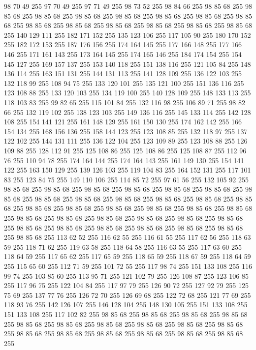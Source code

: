 98 70 49 255 97 70 49 255 97 71 49 255 98 73 52 255 98 84 66 255 98 85 68 255 98 85 68 255 98 85 68 255 98 85 68 255 98 85 68 255 98 85 68 255 98 85 68 255 98 85 68 255 98 85 68 255 98 85 68 255 98 85 68 255 98 85 68 255 98 85 68 255 98 85 68 255 140 129 111 255 182 171 152 255 135 123 106 255 117 105 90 255 180 170 152 255 182 172 153 255 187 176 156 255 174 164 145 255 177 166 148 255 177 166 146 255 171 161 143 255 173 164 145 255 174 165 146 255 184 174 154 255 154 145 127 255 169 157 137 255 153 140 118 255 151 138 116 255 121 105 84 255 148 136 114 255 163 151 131 255 144 131 113 255 141 128 109 255 136 122 103 255 132 118 99 255 108 94 75 255 133 120 101 255 135 121 100 255 151 136 116 255 123 108 88 255 133 120 103 255 134 119 100 255 140 128 109 255 148 133 113 255 118 103 83 255 99 82 65 255 115 101 84 255 132 116 98 255 106 89 71 255 98 82 66 255 132 119 102 255 138 123 103 255 149 136 116 255 145 133 114 255 142 128 108 255
154 141 121 255 161 148 129 255 161 150 130 255 174 162 142 255 166 154 134 255 168 156 136 255 158 144 123 255 123 108 85 255 132 118 97 255 137 122 102 255 144 131 111 255 136 122 104 255 123 109 89 255 123 108 88 255 126 109 88 255 128 112 91 255 125 108 86 255 125 108 86 255 125 108 87 255 112 96 76 255 110 94 78 255 174 164 144 255 174 164 143 255 161 149 130 255 154 141 122 255 163 150 129 255 139 126 103 255 119 104 83 255 164 152 131 255 117 101 83 255 123 84 75 255 149 110 106 255 114 85 72 255 97 61 56 255 132 105 92 255 98 85 68 255 98 85 68 255 98 85 68 255 98 85 68 255 98 85 68 255 98 85 68 255 98 85 68 255 98 85 68 255 98 85 68 255 98 85 68 255 98 85 68 255 98 85 68 255 98 85 68 255 98 85 68 255 98 85 68 255 98 85 68 255 98 85 68 255 98 85 68 255 98 85 68 255 98 85 68 255 98 85 68 255 98 85 68 255 98 85 68 255 98 85 68 255 98 85 68 255 98 85 68 255 98 85 68 255 98 85 68 255 98 85 68 255
98 85 68 255 98 85 68 255 98 85 68 255 113 62 52 255 116 62 55 255 116 61 55 255 117 62 56 255 118 63 59 255 118 71 62 255 119 63 58 255 118 64 58 255 116 63 55 255 117 63 60 255 118 64 59 255 117 65 62 255 117 65 59 255 118 65 59 255 118 67 59 255 118 64 59 255 115 65 60 255 112 71 59 255 101 72 55 255 117 98 74 255 151 133 108 255 116 99 74 255 103 85 60 255 113 95 71 255 121 102 79 255 126 108 87 255 123 106 85 255 117 96 75 255 122 104 84 255 117 97 79 255 126 90 72 255 127 92 79 255 125 75 69 255 137 77 76 255 126 72 70 255 126 69 68 255 122 72 68 255 121 77 69 255 118 93 76 255 142 126 107 255 146 128 104 255 148 130 105 255 151 133 108 255 151 133 108 255 117 102 82 255 98 85 68 255 98 85 68 255 98 85 68 255 98 85 68 255 98 85 68 255 98 85 68 255 98 85 68 255 98 85 68 255 98 85 68 255 98 85 68 255 98 85 68 255 98 85 68 255 98 85 68 255 98 85 68 255 98 85 68 255 98 85 68 255

